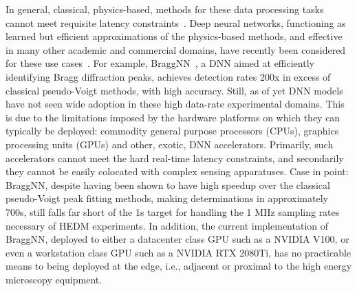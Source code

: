 In general, classical, physics-based, methods for these data processing tasks cannot meet requisite latency constraints~\cite{Sharma:rw5009}.
Deep neural networks, functioning as learned but efficient approximations of the physics-based methods, and effective in many other academic and commercial domains, have recently been considered for these use cases~\cite{Guest:2018yhq}.
For example, BraggNN~\cite{Liu:fs5198}, a DNN aimed at efficiently identifying Bragg diffraction peaks, achieves detection rates 200x in excess of classical pseudo-Voigt methods, with high accuracy.
Still, as of yet DNN models have not seen wide adoption in these high data-rate experimental domains.
This is due to the limitations imposed by the hardware platforms on which they can typically be deployed: commodity general purpose processors (CPUs), graphics processing units (GPUs) and other, exotic, DNN accelerators.
Primarily, such accelerators cannot meet the hard real-time latency constraints, and secondarily they cannot be easily colocated with complex sensing apparatuses.
Case in point: BraggNN, despite having been shown to have high speedup over the classical pseudo-Voigt peak fitting methods, making determinations in approximately 700\textmu s, still falls far short of the 1\textmu s target for handling the 1 MHz sampling rates necessary of HEDM experiments.
In addition, the current implementation of BraggNN, deployed to either a datacenter class GPU such as a NVIDIA V100, or even a workstation class GPU such as a NVIDIA RTX 2080Ti, has no practicable means to being deployed at the edge, i.e., adjacent or proximal to the high energy microscopy equipment.

